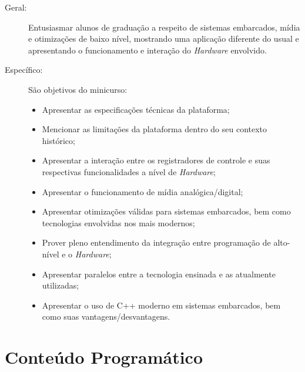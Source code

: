 \documentclass{article}
\begin{document}
\begin{description}
    \item[Geral:] Entusiasmar alunos de graduação a respeito de sistemas
        embarcados, mídia e otimizações de baixo nível, mostrando uma aplicação
        diferente do usual e apresentando o funcionamento e interação do
        \textit{Hardware} envolvido.
    \item[Específico:] São objetivos do minicurso:
        \begin{itemize}[label={-}]
            \item Apresentar as especificações técnicas da plataforma;
            \item Mencionar as limitações da plataforma dentro do seu contexto
                histórico;
            \item Apresentar a interação entre os registradores de controle e
                suas respectivas funcionalidades a nível de \textit{Hardware};
            \item Apresentar o funcionamento de mídia analógica/digital;
            \item Apresentar otimizações válidas para sistemas embarcados, bem
                como tecnologias envolvidas nos mais modernos;
            \item Prover pleno entendimento da integração entre programação de
                alto-nível e o \textit{Hardware};
            \item Apresentar paralelos entre a tecnologia ensinada e as
                atualmente utilizadas;
            \item Apresentar o uso de C++ moderno em sistemas embarcados, bem
                como suas vantagens/desvantagens.
        \end{itemize}
\end{description}

\section{Conteúdo Programático}
\end{document}
